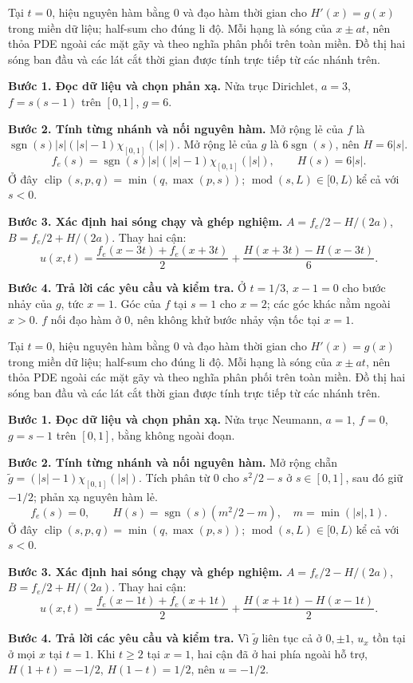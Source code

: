 Tại $t=0$, hiệu nguyên hàm bằng $0$ và đạo hàm thời gian cho $H'(x)=g(x)$ trong miền dữ liệu; half-sum cho đúng li độ. Mỗi hạng là sóng của $x\pm at$, nên thỏa PDE ngoài các mặt gãy và theo nghĩa phân phối trên toàn miền. Đồ thị hai sóng ban đầu và các lát cắt thời gian được tính trực tiếp từ các nhánh trên.

\textbf{Bước 1. Đọc dữ liệu và chọn phản xạ.} Nửa trục Dirichlet, $a=3$, $f=s(s-1)$ trên $[0,1]$, $g=6$.

\textbf{Bước 2. Tính từng nhánh và nối nguyên hàm.} Mở rộng lẻ của $f$ là $\operatorname{sgn}(s)|s|(|s|-1)\chi_{[0,1]}(|s|)$. Mở rộng lẻ của $g$ là $6\operatorname{sgn}(s)$, nên $H=6|s|$.
\[f_e(s)=\operatorname{sgn}(s)|s|(|s|-1)\chi_{[0,1]}(|s|),\qquad H(s)=6|s|.\]
Ở đây $\operatorname{clip}(s,p,q)=\min(q,\max(p,s))$; $\operatorname{mod}(s,L)\in[0,L)$ kể cả với $s<0$.

\textbf{Bước 3. Xác định hai sóng chạy và ghép nghiệm.} $A=f_e/2-H/(2a)$, $B=f_e/2+H/(2a)$. Thay hai cận:
\[u(x,t)=\frac{f_e(x-3t)+f_e(x+3t)}2+\frac{H(x+3t)-H(x-3t)}{6}.\]

\textbf{Bước 4. Trả lời các yêu cầu và kiểm tra.} Ở $t=1/3$, $x-1=0$ cho bước nhảy của $g$, tức $x=1$. Góc của $f$ tại $s=1$ cho $x=2$; các góc khác nằm ngoài $x>0$. $f$ nối đạo hàm ở $0$, nên không khử bước nhảy vận tốc tại $x=1$.

Tại $t=0$, hiệu nguyên hàm bằng $0$ và đạo hàm thời gian cho $H'(x)=g(x)$ trong miền dữ liệu; half-sum cho đúng li độ. Mỗi hạng là sóng của $x\pm at$, nên thỏa PDE ngoài các mặt gãy và theo nghĩa phân phối trên toàn miền. Đồ thị hai sóng ban đầu và các lát cắt thời gian được tính trực tiếp từ các nhánh trên.

\textbf{Bước 1. Đọc dữ liệu và chọn phản xạ.} Nửa trục Neumann, $a=1$, $f=0$, $g=s-1$ trên $[0,1]$, bằng không ngoài đoạn.

\textbf{Bước 2. Tính từng nhánh và nối nguyên hàm.} Mở rộng chẵn $\widetilde g=(|s|-1)\chi_{[0,1]}(|s|)$. Tích phân từ $0$ cho $s^2/2-s$ ở $s\in[0,1]$, sau đó giữ $-1/2$; phản xạ nguyên hàm lẻ.
\[f_e(s)=0,\qquad H(s)=\operatorname{sgn}(s)(m^2/2-m),\quad m=\min(|s|,1).\]
Ở đây $\operatorname{clip}(s,p,q)=\min(q,\max(p,s))$; $\operatorname{mod}(s,L)\in[0,L)$ kể cả với $s<0$.

\textbf{Bước 3. Xác định hai sóng chạy và ghép nghiệm.} $A=f_e/2-H/(2a)$, $B=f_e/2+H/(2a)$. Thay hai cận:
\[u(x,t)=\frac{f_e(x-1t)+f_e(x+1t)}2+\frac{H(x+1t)-H(x-1t)}{2}.\]

\textbf{Bước 4. Trả lời các yêu cầu và kiểm tra.} Vì $\widetilde g$ liên tục cả ở $0,\pm1$, $u_x$ tồn tại ở mọi $x$ tại $t=1$. Khi $t\ge2$ tại $x=1$, hai cận đã ở hai phía ngoài hỗ trợ, $H(1+t)=-1/2$, $H(1-t)=1/2$, nên $u=-1/2$.


